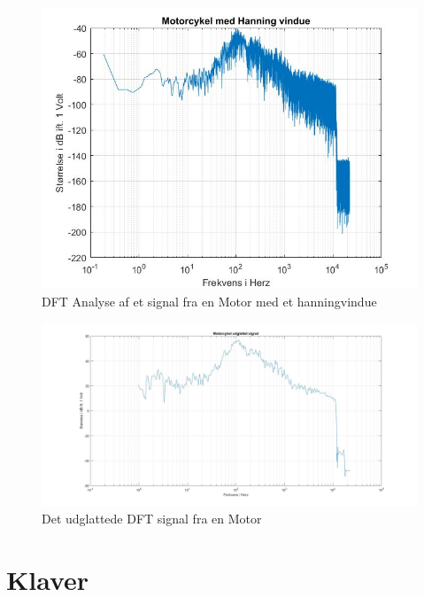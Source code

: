 \begin{figure}[ht!]
	\centering
	\includegraphics[width=180mm]{figures/Motor/hanning.jpg}
	\caption{DFT Analyse af et signal fra en Motor med et hanningvindue}
	\label{fig:Motor hanning}
\end{figure}

\begin{figure}[ht!]
	\centering
	\includegraphics[width=180mm]{figures/Motor/udglattet.jpg}
	\caption{Det udglattede DFT signal fra en Motor}
	\label{fig:Motor udglattet}
\end{figure}

\section{Klaver}

